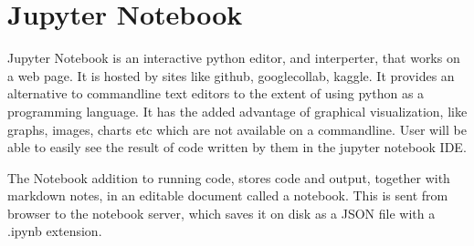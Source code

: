 \section{Jupyter Notebook}
Jupyter Notebook is an interactive python editor, and interperter, that works on a web page. It is hosted by sites like github, googlecollab, kaggle.
It provides an alternative to commandline text editors to the extent of using python as a programming language. It has the added advantage of graphical
visualization, like graphs, images, charts etc which are not available on a commandline. User will be able to easily see the result of code written
by them in the jupyter notebook IDE.


The Notebook addition to running code, stores code and output, together with markdown notes, in an editable document called a notebook. This is sent from browser to the notebook server, which saves it on disk as a JSON file with a .ipynb extension.
